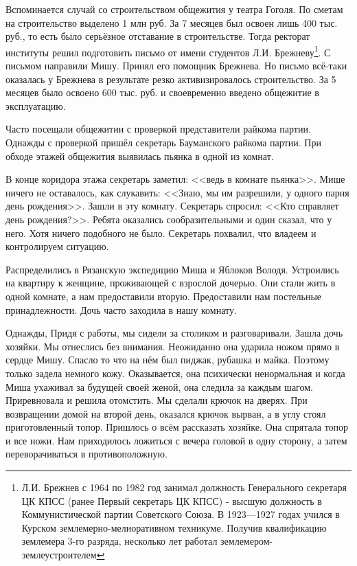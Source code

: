 Вспоминается случай со строительством общежития у театра Гоголя. По сметам на строительство выделено 1 млн руб. За 7 месяцев был освоен лишь 400 тыс. руб., то есть было серьёзное отставание в строительстве. Тогда ректорат институты решил подготовить письмо от имени студентов Л.И. Брежневу\footnote{Л.И. Брежнев с 1964 по 1982 год занимал должность Генерального секретаря ЦК КПСС (ранее Первый секретарь ЦК КПСС) - высшую должность в Коммунистической партии Советского Союза. В 1923—1927 годах учился в Курском землемерно-мелиоративном техникуме. Получив квалификацию землемера 3-го разряда, несколько лет работал землемером-землеустроителем}. С письмом направили Мишу. Принял его помощник Брежнева. Но письмо всё-таки оказалась у Брежнева в результате резко активизировалось строительство. За 5 месяцев было освоено 600 тыс. руб. и своевременно введено общежитие в эксплуатацию.

Часто посещали общежитии с проверкой представители райкома партии. Однажды с проверкой пришёл секретарь Бауманского райкома партии. При обходе этажей общежития выявилась пьянка в одной из комнат. 

В конце коридора этажа секретарь заметил: <<ведь в комнате пьянка>>. Мише ничего не оставалось, как слукавить: <<Знаю, мы им разрешили, у одного парня день рождения>>. Зашли в эту комнату. Секретарь спросил: <<Кто справляет день рождения?>>. Ребята оказались сообразительными и один сказал, что у него. Хотя ничего подобного не было. Секретарь похвалил, что владеем и контролируем ситуацию.

Распределились в Рязанскую экспедицию Миша и Яблоков Володя. Устроились на квартиру к женщине, проживающей с взрослой дочерью. Они стали жить в одной комнате, а нам предоставили вторую. Предоставили нам постельные принадлежности. Дочь часто заходила в нашу комнату.

Однажды, Придя с работы, мы сидели за столиком и разговаривали. Зашла дочь хозяйки. Мы отнеслись без внимания. Неожиданно она ударила ножом прямо в сердце Мишу. Спасло то что на нём был пиджак, рубашка и майка. Поэтому только задела немного кожу. Оказывается, она психически ненормальная и когда Миша ухаживал за будущей своей женой, она следила за каждым шагом. Приревновала и решила отомстить. Мы сделали крючок на дверях. При возвращении домой на второй день, оказался крючок вырван, а в углу стоял приготовленный топор. Пришлось о всём рассказать хозяйке. Она спрятала топор и все ножи. Нам приходилось ложиться с вечера головой в одну сторону, а затем переворачиваться в противоположную.

